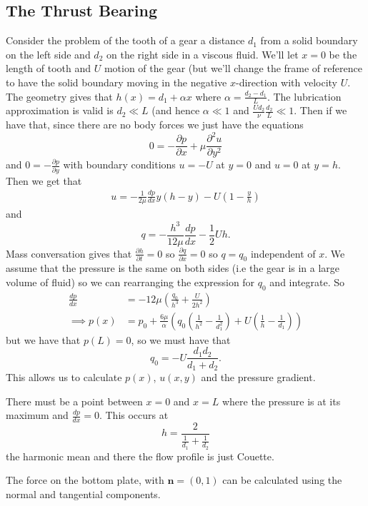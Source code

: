 \documentclass{article}
\begin{document}
\subsection{The Thrust Bearing}
Consider the problem of the tooth of a gear a distance $ d_1 $ from a solid boundary on the left side and $ d_2 $ on the right side in a viscous fluid. We'll let $ x=0 $ be the length of tooth and $ U $ motion of the gear (but we'll change the frame of reference to have the solid boundary moving in the negative $ x $-direction with velocity $ U $. The geometry gives that $ h(x) = d_1 + \alpha x $ where $ \alpha = \frac{d_2 -d_1}L $. The lubrication approximation is valid is $ d_2\ll L $ (and hence $ \alpha \ll 1 $ and $ \frac{Ud_2}\nu \frac{d_2}L \ll 1 $. Then if we have that, since there are no body forces we just have the equations
\[
   0 = - \frac{\partial p}{\partial x} + \mu \frac{\partial^2 u}{\partial y^2}
\]
and $0 = - \frac{\partial p}{\partial y} $ with boundary conditions $ u  = -U $ at $ y=0 $ and $ u = 0 $ at $ y =h $. Then we get that
\begin{align*}
	u = - \frac 1{2\mu}\frac{dp}{dx} y(h-y) - U\left(1-\frac yh\right)
\end{align*}
and 
\[
	q = -\frac{h^3}{12\mu} \frac{dp}{dx} - \frac 12 Uh.
\]
Mass conversation gives that $ \frac{\partial h}{\partial t} = 0 $ so $ \frac{\partial q}{\partial x} = 0 $ so $ q = q_0 $ independent of $ x $. We assume that the pressure is the same on both sides (i.e the gear is in a large volume of fluid) so we can rearranging the expression for $ q_0 $ and integrate. So
\begin{align*}
	\frac{dp}{dx} &= - 12 \mu \left(\frac{q_0}{h^3}+ \frac{U}{2h^2}\right)\\
	\implies p(x) &= p_0 + \frac{6\mu}\alpha\left(q_0\left(\frac 1{h^2} - \frac 1{d_1^2}\right) + U\left(\frac 1h - \frac 1{d_1}\right)\right)
\end{align*}
but we have that $ p(L) = 0 $, so we must have that 
\[
	q_0 = -U \frac{d_1d_2}{d_1+d_2}.
\]
This allows us to calculate $ p(x) $, $ u(x,y) $ and the pressure gradient.
\begin{remark}
	There must be a point between $ x=0 $ and $ x=L $ where the pressure is at its maximum and $ \frac{dp}{dx} = 0 $. This occurs at
	\[
		h = \frac{2}{\frac 1{d_1} + \frac 1{d_2}}
	\]
	the harmonic mean and there the flow profile is just Couette.
\end{remark}
The force on the bottom plate, with $ \mathbf n = (0,1) $ can be calculated using the normal and tangential components. 
\end{document}
